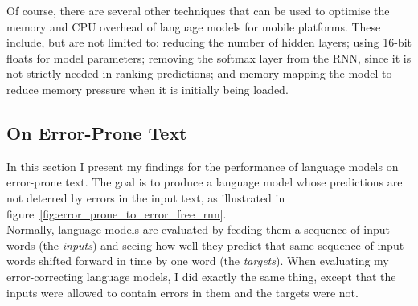 \documentclass[a4paper, 12pt]{report}
\newcommand{\tit}[1]{\textit{#1}}
\begin{document}
Of course, there are several other techniques that can be used to optimise the memory and CPU overhead of language models for mobile platforms. These include, but are not limited to: reducing the number of hidden layers; using 16-bit floats for model parameters; removing the softmax layer from the RNN, since it is not strictly needed in ranking predictions; and memory-mapping the model to reduce memory pressure when it is initially being loaded.

\subsection{On Error-Prone Text} \label{error_prone_evaluation}

In this section I present my findings for the performance of language models on error-prone text. The goal is to produce a language model whose predictions are not deterred by errors in the input text, as illustrated in figure~\ref{fig:error_prone_to_error_free_rnn}. \\

Normally, language models are evaluated by feeding them a sequence of input words (the \tit{inputs}) and seeing how well they predict that same sequence of input words shifted forward in time by one word (the \tit{targets}). When evaluating my error-correcting language models, I did exactly the same thing, except that the inputs were allowed to contain errors in them and the targets were not. \\
\end{document}
